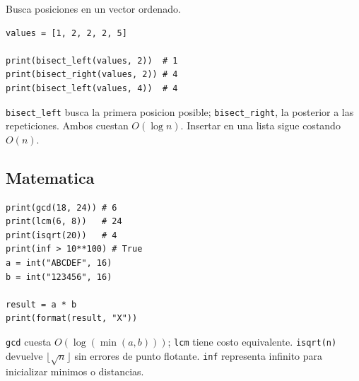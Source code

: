 Busca posiciones en un vector ordenado.

\begin{lstlisting}[style=py]
values = [1, 2, 2, 2, 5]

print(bisect_left(values, 2))  # 1
print(bisect_right(values, 2)) # 4
print(bisect_left(values, 4))  # 4
\end{lstlisting}

\texttt{bisect\_left} busca la primera posicion posible; \texttt{bisect\_right},
la posterior a las repeticiones. Ambos cuestan $O(\log n)$.
Insertar en una lista sigue costando $O(n)$.

\subsection{Matematica}

\begin{lstlisting}[style=py]
print(gcd(18, 24)) # 6
print(lcm(6, 8))   # 24
print(isqrt(20))   # 4
print(inf > 10**100) # True
a = int("ABCDEF", 16)
b = int("123456", 16)

result = a * b
print(format(result, "X"))
\end{lstlisting}

\texttt{gcd} cuesta $O(\log(\min(a,b)))$; \texttt{lcm} tiene costo equivalente.
\texttt{isqrt(n)} devuelve $\lfloor\sqrt n\rfloor$ sin errores de punto flotante.
\texttt{inf} representa infinito para inicializar minimos o distancias.